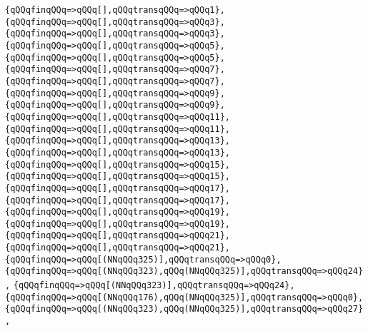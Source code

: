 \verb|{qQQqfinqQQq=>qQQq[],qQQqtransqQQq=>qQQq1},|\newline
\verb|{qQQqfinqQQq=>qQQq[],qQQqtransqQQq=>qQQq3},|\newline
\verb|{qQQqfinqQQq=>qQQq[],qQQqtransqQQq=>qQQq3},|\newline
\verb|{qQQqfinqQQq=>qQQq[],qQQqtransqQQq=>qQQq5},|\newline
\verb|{qQQqfinqQQq=>qQQq[],qQQqtransqQQq=>qQQq5},|\newline
\verb|{qQQqfinqQQq=>qQQq[],qQQqtransqQQq=>qQQq7},|\newline
\verb|{qQQqfinqQQq=>qQQq[],qQQqtransqQQq=>qQQq7},|\newline
\verb|{qQQqfinqQQq=>qQQq[],qQQqtransqQQq=>qQQq9},|\newline
\verb|{qQQqfinqQQq=>qQQq[],qQQqtransqQQq=>qQQq9},|\newline
\verb|{qQQqfinqQQq=>qQQq[],qQQqtransqQQq=>qQQq11},|\newline
\verb|{qQQqfinqQQq=>qQQq[],qQQqtransqQQq=>qQQq11},|\newline
\verb|{qQQqfinqQQq=>qQQq[],qQQqtransqQQq=>qQQq13},|\newline
\verb|{qQQqfinqQQq=>qQQq[],qQQqtransqQQq=>qQQq13},|\newline
\verb|{qQQqfinqQQq=>qQQq[],qQQqtransqQQq=>qQQq15},|\newline
\verb|{qQQqfinqQQq=>qQQq[],qQQqtransqQQq=>qQQq15},|\newline
\verb|{qQQqfinqQQq=>qQQq[],qQQqtransqQQq=>qQQq17},|\newline
\verb|{qQQqfinqQQq=>qQQq[],qQQqtransqQQq=>qQQq17},|\newline
\verb|{qQQqfinqQQq=>qQQq[],qQQqtransqQQq=>qQQq19},|\newline
\verb|{qQQqfinqQQq=>qQQq[],qQQqtransqQQq=>qQQq19},|\newline
\verb|{qQQqfinqQQq=>qQQq[],qQQqtransqQQq=>qQQq21},|\newline
\verb|{qQQqfinqQQq=>qQQq[],qQQqtransqQQq=>qQQq21},|\newline
\verb|{qQQqfinqQQq=>qQQq[(NNqQQq325)],qQQqtransqQQq=>qQQq0},|\newline
\verb|{qQQqfinqQQq=>qQQq[(NNqQQq323),qQQq(NNqQQq325)],qQQqtransqQQq=>qQQq24},|\newline
\verb|{qQQqfinqQQq=>qQQq[(NNqQQq323)],qQQqtransqQQq=>qQQq24},|\newline
\verb|{qQQqfinqQQq=>qQQq[(NNqQQq176),qQQq(NNqQQq325)],qQQqtransqQQq=>qQQq0},|\newline
\verb|{qQQqfinqQQq=>qQQq[(NNqQQq323),qQQq(NNqQQq325)],qQQqtransqQQq=>qQQq27},|\newline
